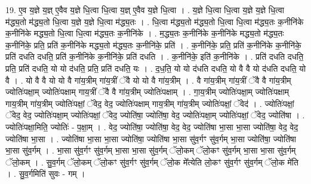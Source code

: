 \documentclass[17pt]{extarticle}
\begin{document}
19. ए॒व य॒ज्ञे य॒ज्ञ् ए॒वैव य॒ज्ञे धि॒त्वा धि॒त्वा य॒ज्ञ् ए॒वैव य॒ज्ञे धि॒त्वा । . य॒ज्ञे धि॒त्वा धि॒त्वा य॒ज्ञे य॒ज्ञे धि॒त्वा म॑द्ध्य॒तो म॑द्ध्य॒तो धि॒त्वा य॒ज्ञे य॒ज्ञे धि॒त्वा म॑द्ध्य॒तः । . धि॒त्वा म॑द्ध्य॒तो म॑द्ध्य॒तो धि॒त्वा धि॒त्वा म॑द्ध्य॒तः क॒नीनि॑के क॒नीनि॑के मद्ध्य॒तो धि॒त्वा धि॒त्वा म॑द्ध्य॒तः क॒नीनि॑के । . म॒द्ध्य॒तः क॒नीनि॑के क॒नीनि॑के मद्ध्य॒तो म॑द्ध्य॒तः क॒नीनि॑के॒ प्रति॒ प्रति॑ क॒नीनि॑के मद्ध्य॒तो म॑द्ध्य॒तः क॒नीनि॑के॒ प्रति॑ । . क॒नीनि॑के॒ प्रति॒ प्रति॑ क॒नीनि॑के क॒नीनि॑के॒ प्रति॑ दधति दधति॒ प्रति॑ क॒नीनि॑के क॒नीनि॑के॒ प्रति॑ दधति । . क॒नीनि॑के॒ इति॑ क॒नीनि॑के । . प्रति॑ दधति दधति॒ प्रति॒ प्रति॑ दधति॒ यो यो द॑धति॒ प्रति॒ प्रति॑ दधति॒ यः । . द॒ध॒ति॒ यो यो द॑धति दधति॒ यो वै वै यो द॑धति दधति॒ यो वै । . यो वै वै यो यो वै गा॑य॒त्रीम् गा॑य॒त्रीं ॅवै यो यो वै गा॑य॒त्रीम् । . वै गा॑य॒त्रीम् गा॑य॒त्रीं ॅवै वै गा॑य॒त्रीम् ज्योतिः॑पक्षा॒म् ज्योतिः॑पक्षाम् गाय॒त्रीं ॅवै वै गा॑य॒त्रीम् ज्योतिः॑पक्षाम् । . गा॒य॒त्रीम् ज्योतिः॑पक्षा॒म् ज्योतिः॑पक्षाम् गाय॒त्रीम् गा॑य॒त्रीम् ज्योतिः॑पक्षां॒ ॅवेद॒ वेद॒ ज्योतिः॑पक्षाम् गाय॒त्रीम् गा॑य॒त्रीम् ज्योतिः॑पक्षां॒ ॅवेद॑ । . ज्योतिः॑पक्षां॒ ॅवेद॒ वेद॒ ज्योतिः॑पक्षा॒म् ज्योतिः॑पक्षां॒ ॅवेद॒ ज्योति॑षा॒ ज्योति॑षा॒ वेद॒ ज्योतिः॑पक्षा॒म् ज्योतिः॑पक्षां॒ ॅवेद॒ ज्योति॑षा । . ज्योतिः॑पक्षा॒मिति॒ ज्योतिः॑ - प॒क्षा॒म् । . वेद॒ ज्योति॑षा॒ ज्योति॑षा॒ वेद॒ वेद॒ ज्योति॑षा भा॒सा भा॒सा ज्योति॑षा॒ वेद॒ वेद॒ ज्योति॑षा भा॒सा । . ज्योति॑षा भा॒सा भा॒सा ज्योति॑षा॒ ज्योति॑षा भा॒सा सु॑व॒र्गꣳ सु॑व॒र्गम् भा॒सा ज्योति॑षा॒ ज्योति॑षा भा॒सा सु॑व॒र्गम् । . भा॒सा सु॑व॒र्गꣳ सु॑व॒र्गम् भा॒सा भा॒सा सु॑व॒र्गम् ॅलो॒कम् ॅलो॒कꣳ सु॑व॒र्गम् भा॒सा भा॒सा सु॑व॒र्गम् ॅलो॒कम् । . सु॒व॒र्गम् ॅलो॒कम् ॅलो॒कꣳ सु॑व॒र्गꣳ सु॑व॒र्गम् ॅलो॒क मे᳚त्येति लो॒कꣳ सु॑व॒र्गꣳ सु॑व॒र्गम् ॅलो॒क मे॑ति । . सु॒व॒र्गमिति॑ सुवः - गम् । \newline
\end{document}
